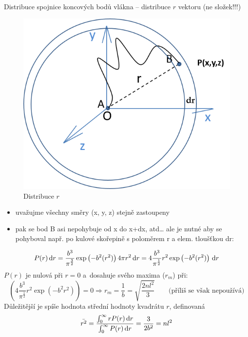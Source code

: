 Distribuce spojnice koncových bodů vlákna -- distribuce $r$ vektoru (ne složek!!!)
\begin{figure}[H]
	\centering
	\includegraphics{Obrazky/distribuce-r}
	\caption{Distribuce $r$}
	\label{fig:distribuce-r}
\end{figure}

\begin{itemize}
	\item uvažujme všechny směry (x, y, z) stejně zastoupeny
	\item pak se bod B asi nepohybuje od x do x+dx, atd… ale je nutné aby se pohyboval např. po kulové skořepině s poloměrem r a elem. tloušťkou dr:
\end{itemize}
\begin{equation}
	P(r) \,\mathrm{d} r
	= \frac{b^3}{\pi^{\frac{3}{2}}} \exp\left(-b^2(r^2)\right) 4 \pi r^2 \,\mathrm{d} r
	= 4 \frac{b^3}{\pi^{\frac{1}{2}}} r^2 \exp\left(-b^2(r^2)\right) \,\mathrm{d} r
\end{equation}
$P(r)$ je nulová při $r = 0$ a~dosahuje svého maxima ($r_m$) při: 
\begin{equation}
	\left(4 \frac{b^3}{\pi^{\frac{1}{2}}} r^2 \exp\left(-b^2 r^2\right)\right)
	= 0 \Rightarrow
	r_m = \frac{1}{b} = \sqrt{\frac{2 n l^2}{3}} \qquad\text{(příliš se však nepoužívá)}
\end{equation}
Důležitější je spíše hodnota střední hodnoty kvadrátu $r$, definovaná
\begin{equation}
	\bar{r^2} = \frac{\int_0^\infty r P(r) \,\mathrm{d} r}{\int_0^\infty P(r) \,\mathrm{d} r}
	= \frac{3}{2 b^2} = n l^2
\end{equation}

